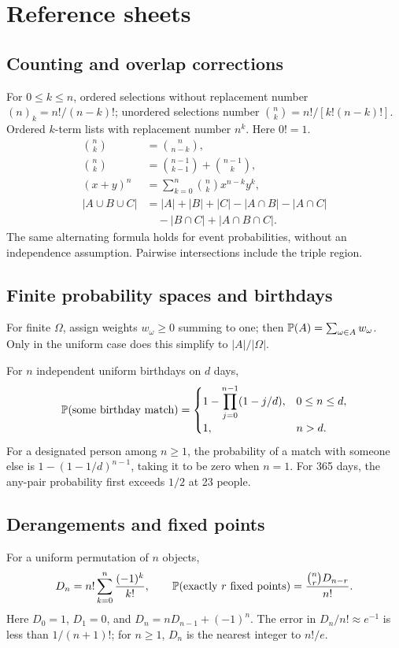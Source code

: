 \chapter{Reference sheets}

\section*{Counting and overlap corrections}
For $0\le k\le n$, ordered selections without replacement number
$(n)_k=n!/(n-k)!$; unordered selections number
$\binom nk=n!/[k!(n-k)!]$. Ordered $k$-term lists with replacement number
$n^k$. Here $0!=1$.
\begin{align*}
\binom nk&=\binom n{n-k},\\
\binom nk&=\binom{n-1}{k-1}+\binom{n-1}{k},\\
(x+y)^n&=\sum_{k=0}^n\binom nk x^{n-k}y^k,\\
|A\cup B\cup C|&=|A|+|B|+|C|-|A\cap B|-|A\cap C|\\
&\quad-|B\cap C|+|A\cap B\cap C|.
\end{align*}
The same alternating formula holds for event probabilities, without an
independence assumption. Pairwise intersections include the triple region.

\section*{Finite probability spaces and birthdays}
For finite $\Omega$, assign weights $w_\omega\ge0$ summing to one;
then $\P(A)=\sum_{\omega\in A}w_\omega$. Only in the uniform case does
this simplify to $|A|/|\Omega|$.

For $n$ independent uniform birthdays on $d$ days,
\[
\P(\text{some birthday match})=
\begin{cases}
1-\displaystyle\prod_{j=0}^{n-1}(1-j/d),&0\le n\le d,\\
1,&n>d.
\end{cases}
\]
For a designated person among $n\ge1$, the probability of a match with
someone else is $1-(1-1/d)^{n-1}$, taking it to be zero when $n=1$.
For 365 days, the any-pair probability first exceeds $1/2$ at 23 people.

\section*{Derangements and fixed points}
For a uniform permutation of $n$ objects,
\[
 D_n=n!\sum_{k=0}^n\frac{(-1)^k}{k!},\qquad
 \P(\text{exactly }r\text{ fixed points})=\frac{\binom nrD_{n-r}}{n!}.
\]
Here $D_0=1$, $D_1=0$, and $D_n=nD_{n-1}+(-1)^n$.
The error in $D_n/n!\approx e^{-1}$ is less than $1/(n+1)!$;
for $n\ge1$, $D_n$ is the nearest integer to $n!/e$.

